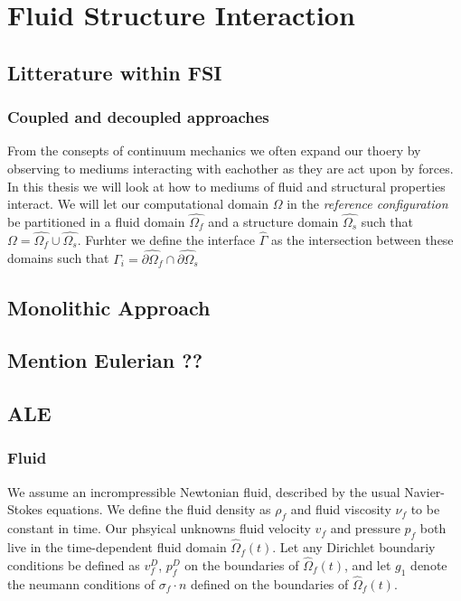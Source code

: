 \chapter{Fluid Structure Interaction}

\section{Litterature within FSI}
\subsection{Coupled and decoupled approaches}

From the consepts of continuum mechanics we often expand our thoery by observing to mediums interacting with eachother as they
are act upon by forces. In this thesis we will look at how to mediums of fluid and structural properties interact. We will let our computational domain $\Omega$ in the \textit{reference configuration} be partitioned in a fluid domain $\hat{\Omega_f}$ and a structure domain $\hat{\Omega_s}$ such that
$\Omega = \hat{\Omega_f} \cup \hat{\Omega_s}$. Furhter we define the interface $\hat{\Gamma}$ as the intersection between these domains such that $\Gamma_i = \hat{\partial \Omega_f} \cap \hat{\partial \Omega_s}$ \newline \newline

\section{Monolithic Approach}
\section{Mention Eulerian ??}
\section{ALE}

\subsection{Fluid}
We assume an incrompressible Newtonian fluid, described by the usual Navier-Stokes equations. We define the fluid density as $\rho_f$ and fluid viscosity $\nu_f$ to be constant in time. Our phsyical unknowns
fluid velocity $v_f$ and pressure $p_f$ both live in the time-dependent fluid domain  $\hat{\Omega}_f(t)$. Let any Dirichlet boundariy conditions be defined as $v_f^D$, $p_f^D$ on the boundaries
of  $\hat{\Omega}_f(t)$, and let $g_1$ denote the neumann conditions of $\sigma_f \cdot n$ defined on the boundaries of $\hat{\Omega}_f(t)$.

